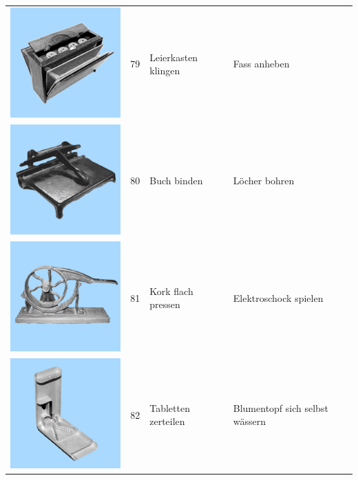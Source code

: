 \documentclass[
  english,
  doc,12pt,twoside,floatsintext]{apa7}
\begin{document}
\begin{center}
\begin{ThreePartTable}
\begin{longtable}{llll}
\includegraphics[valign=c, scale=0.19]{../materials/unfamiliar/79.png} & 79 & Leierkasten klingen & Fass anheben\\
\includegraphics[valign=c, scale=0.19]{../materials/unfamiliar/80.png} & 80 & Buch binden & Löcher bohren\\
\includegraphics[valign=c, scale=0.19]{../materials/unfamiliar/81.png} & 81 & Kork flach pressen & Elektroschock spielen\\
\includegraphics[valign=c, scale=0.19]{../materials/unfamiliar/82.png} & 82 & Tabletten zerteilen & Blumentopf sich selbst wässern\\

\end{longtable}
\end{ThreePartTable}
\end{center}
\end{document}
